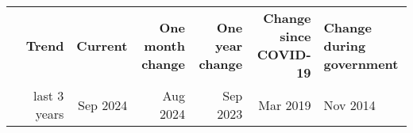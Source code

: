 \begin{table}[H]
\begin{tabular}{l r r r r r}
\hline
 & \textbf{Trend} & \textbf{Current} & \textbf{One month change} & \textbf{One year change} & \textbf{Change since COVID-19} & \textbf{Change during government} \\
 & \small{last 3 years} & \small{Sep 2024} & \small{Aug 2024} & \small{Sep 2023} & \small{Mar 2019} & \small{Nov 2014} \\
\hline
\end{tabular}
\end{table}
